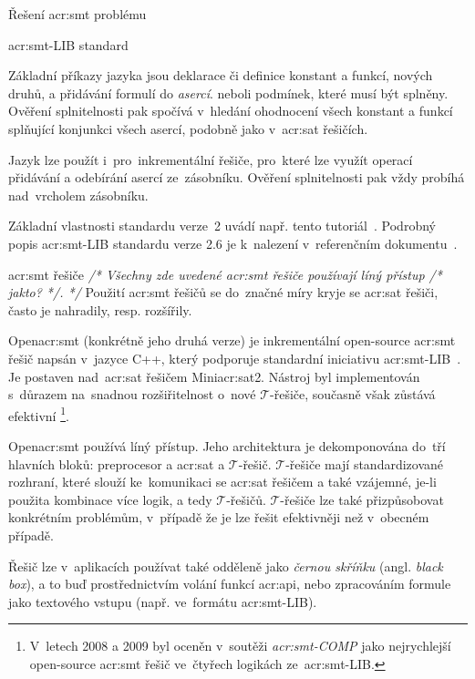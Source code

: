 \documentclass[thesis=M,czech]{FITthesis}[2012/06/26]
\newcommand{\acrlabel}[1]{acr:#1}
\newcommand{\acr}[1]{\acrshort{\acrlabel{#1}}}
\newcommand{\cmt}[1]{\textit{/* #1 */}}
\newcommand{\hl}[1]{\textit{#1}}
\newcommand{\name}[1]{\hl{#1}}
\newcommand{\cit}[1]{\cite{#1}}
\newcommand{\set}[1]{\ensuremath{\mathcal{#1}}}
\begin{document}
\begin{section}{Řešení \acr{smt} problému}
\begin{subsection}{\acr{smt}-LIB standard}
\bigskip

Základní příkazy jazyka jsou deklarace či definice konstant a funkcí,
nových druhů, a přidávání formulí do \name{asercí}.
neboli podmínek, které musí být splněny.
Ověření splnitelnosti pak spočívá v~hledání ohodnocení
všech konstant a funkcí splňující konjunkci všech asercí,
podobně jako v~\acr{sat} řešičích.

Jazyk lze použít i~pro~inkrementální řešiče,
pro~které lze využít operací přidávání a odebírání
asercí ze~zásobníku.
Ověření splnitelnosti pak vždy probíhá
nad~vrcholem zásobníku.

Základní vlastnosti standardu verze~2
uvádí např. tento tutoriál~\cit{smtlib-tutorial-art}.
Podrobný popis \acr{smt}-LIB standardu verze 2.6
je k~nalezení v~referenčním dokumentu~\cit{smtlib-reference-art}.
\end{subsection} %


\begin{subsection}{\acr{smt} řešiče}\label{ss:search:smt:solver}
\cmt{Všechny zde uvedené \acr{smt} řešiče používají
líný přístup \cmt{jakto?}.}
Použití \acr{smt} řešičů se do~značné míry kryje se \acr{sat} řešiči,
často je nahradily, resp. rozšířily.


\begin{paragraph}{Open\acr{smt}}\label{p:search:smt:solver:opensmt}
(konkrétně jeho druhá verze)
je inkrementální open-source \acr{smt} řešič napsán v~jazyce C++,
který podporuje standardní iniciativu
\acr{smt}-LIB~\cit{opensmt}\cit{opensmt-art}.
Je postaven
nad~\acr{sat} řešičem Mini\acr{sat}2.
Nástroj byl implementován
s~důrazem na~snadnou rozšiřitelnost o~nové \set{T}-řešiče,
současně však zůstává efektivní%
\footnote{V~letech 2008 a 2009
byl oceněn v~soutěži \name{\acr{smt}-COMP}
jako nejrychlejší open-source \acr{smt} řešič
ve~čtyřech logikách ze~\acr{smt}-LIB.}.

Open\acr{smt} používá líný přístup.
Jeho architektura je dekomponována do~tří hlavních bloků:
preprocesor a \acr{sat} a \set{T}-řešič.
\set{T}-řešiče mají standardizované rozhraní,
které slouží ke~komunikaci se \acr{sat} řešičem a také vzájemné,
je-li použita kombinace více logik, a tedy \set{T}-řešičů.
\set{T}-řešiče lze také přizpůsobovat
konkrétním problémům,
v~případě že je lze řešit efektivněji než v~obecném případě.

Řešič lze v~aplikacích používat také odděleně
jako \name{černou skříňku} (angl. \name{black box}),
a to buď prostřednictvím volání funkcí \acr{api},
nebo zpracováním formule jako textového vstupu
(např. ve~formátu \acr{smt}-LIB).


\end{paragraph}
\end{subsection}
\end{section}
\end{document}
